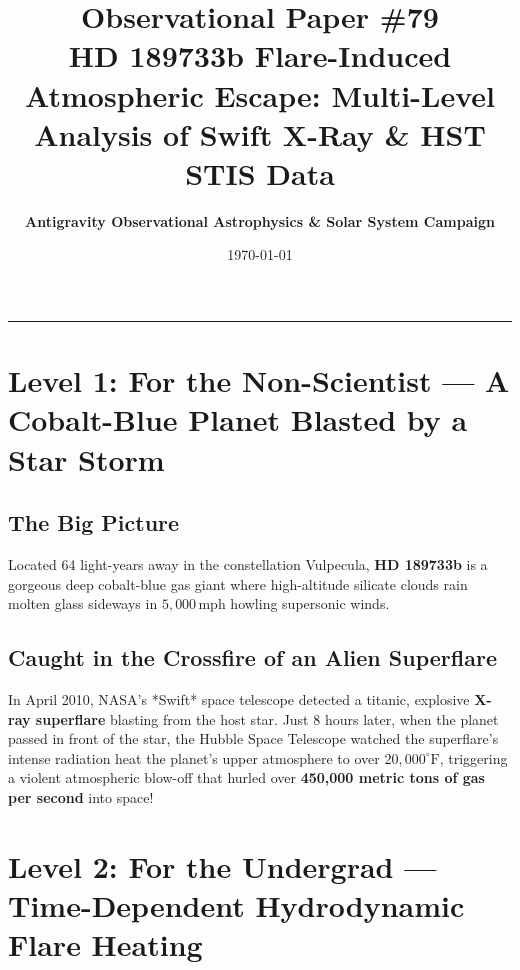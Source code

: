 \documentclass[11pt,a4paper]{article}
\title{\Huge \textbf{Observational Paper \#79}\\ \Large HD 189733b Flare-Induced Atmospheric Escape: Multi-Level Analysis of Swift X-Ray \& HST STIS Data}
\author{\textbf{Antigravity Observational Astrophysics \& Solar System Campaign}}
\date{\today}
\begin{document}
\maketitle

\vspace{-1em}
\begin{center}
\rule{\textwidth}{1.5pt}
\end{center}

\section*{Level 1: For the Non-Scientist — A Cobalt-Blue Planet Blasted by a Star Storm}

\subsection*{The Big Picture}
Located 64 light-years away in the constellation Vulpecula, \textbf{HD 189733b} is a gorgeous deep cobalt-blue gas giant where high-altitude silicate clouds rain molten glass sideways in $5{,}000\,\text{mph}$ howling supersonic winds.

\subsection*{Caught in the Crossfire of an Alien Superflare}
In April 2010, NASA's *Swift* space telescope detected a titanic, explosive \textbf{X-ray superflare} blasting from the host star. Just 8 hours later, when the planet passed in front of the star, the Hubble Space Telescope watched the superflare's intense radiation heat the planet's upper atmosphere to over $20{,}000^\circ\text{F}$, triggering a violent atmospheric blow-off that hurled over \textbf{450,000 metric tons of gas per second} into space!

\newpage

\section*{Level 2: For the Undergrad — Time-Dependent Hydrodynamic Flare Heating}
\end{document}
